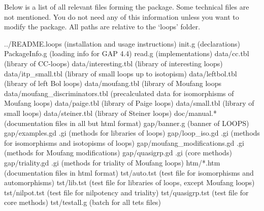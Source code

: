 
Below is a list of all relevant files forming the {\LOOPS} package. Some
technical files are not mentioned. You do not need any of this information
unless you want to modify the package. All paths are relative to the
`loops' folder.

\begintt
../README.loops (installation and usage instructions)
init.g (declarations)
PackageInfo.g (loading info for GAP 4.4)
read.g (implementations)
data/cc.tbl (library of CC-loops)
data/interesting.tbl (library of interesting loops)
data/itp_small.tbl (library of small loops up to isotopism)
data/leftbol.tbl (library of left Bol loops)
data/moufang.tbl (library of Moufang loops
data/moufang_discriminators.tbl (precalculated data for isomorphisms of Moufang loops)
data/paige.tbl (library of Paige loops)
data/small.tbl (library of small loops)
data/steiner.tbl (library of Steiner loops)
doc/manual.* (documentation files in all but html format)
gap/banner.g (banner of LOOPS)
gap/examples.gd .gi (methods for libraries of loops)
gap/loop_iso.gd .gi (methods for isomorphisms and isotopisms of loops)
gap/moufang_modifications.gd .gi (methods for Moufang modifications)
gap/quasigrp.gd .gi (core methods)
gap/triality.gd .gi (methods for triality of Moufang loops)
htm/*.htm (documentation files in html format)
tst/auto.tst (test file for isomorphisms and automorphisms)
tst/lib.tst (test file for libraries of loops, except Moufang loops)
tst/nilpot.tst (test file for nilpotency and triality)
tst/quasigrp.tst (test file for core methods)
tst/testall.g (batch for all tets files)
\endtt
